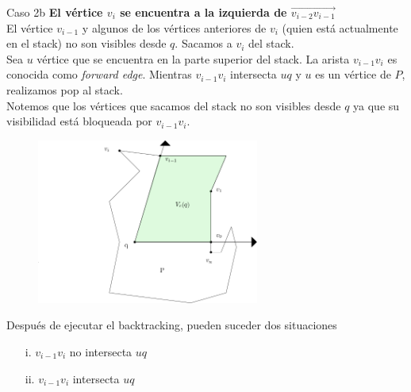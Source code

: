 \documentclass[aspectratio=169,xcolor=dvipsnames, t]{beamer}
\begin{document}

\begin{frame}{Caso 2b}
    \textbf{El vértice $v_{i}$ se encuentra a la izquierda de $\overrightarrow{v_{i-2}v_{i-1}}$}\\
    El vértice $v_{i-1}$ y algunos de los vértices anteriores de $v_{i}$ (quien está actualmente en el stack) no son visibles desde $q$. Sacamos a $v_{i}$ del stack. \\
    \vspace{0.5cm}
    Sea $u$ vértice que se encuentra en la parte superior del stack. La arista $v_{i-1}v_{i}$ es conocida como \textit{forward edge}. Mientras $v_{i-1}v_{i}$ intersecta $uq$ y $u$ es un vértice de $P$, realizamos pop al stack.\\
    \vspace{0.5cm}
    Notemos que los vértices que sacamos del stack no son visibles desde $q$ ya que su visibilidad está bloqueada por $v_{i-1}v_{i}$. \\
    \begin{figure}
            \centering
            \includegraphics[width=0.65\textwidth]{imagenes/Caso2.4a.png}
    \end{figure}
\end{frame}


\begin{frame}[c]
    Después de ejecutar el backtracking, pueden suceder dos situaciones
    \begin{center}
        \begin{enumerate}
            \item [i.] $v_{i-1}v_{i}$ no intersecta $uq$
            \item [ii.] $v_{i-1}v_{i}$ intersecta $uq$
        \end{enumerate}
    \end{center}
\end{frame}
\end{document}
